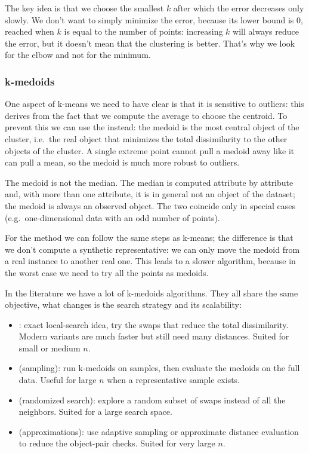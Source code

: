 The key idea is that we choose the smallest $k$ after which the error decreases only slowly. We don't want to simply minimize the error, because its lower bound is $0$, reached when $k$ is equal to the number of points: increasing $k$ will always reduce the error, but it doesn't mean that the clustering is better. That's why we look for the elbow and not for the minimum.

\subsubsection{k-medoids}

One aspect of k-means we need to have clear is that it is sensitive to outliers: this derives from the fact that we compute the average to choose the centroid. To prevent this we can use the  instead: the medoid is the most central object of the cluster, i.e.\ the real object that minimizes the total dissimilarity to the other objects of the cluster. A single extreme point cannot pull a medoid away like it can pull a mean, so the medoid is much more robust to outliers.

\begin{remark}
The medoid is not the median. The median is computed attribute by attribute and, with more than one attribute, it is in general not an object of the dataset; the medoid is always an observed object. The two coincide only in special cases (e.g.\ one-dimensional data with an odd number of points).
\end{remark}

For the  method we can follow the same steps as k-means; the difference is that we don't compute a synthetic representative: we can only move the medoid from a real instance to another real one. This leads to a slower algorithm, because in the worst case we need to try all the points as medoids.

In the literature we have a lot of k-medoids algorithms. They all share the same objective, what changes is the search strategy and its scalability:
\begin{itemize}
  \item {}: exact local-search idea, try the swaps that reduce the total dissimilarity. Modern variants are much faster but still need many distances. Suited for small or medium $n$.
  \item {} (sampling): run k-medoids on samples, then evaluate the medoids on the full data. Useful for large $n$ when a representative sample exists.
  \item {} (randomized search): explore a random subset of swaps instead of all the neighbors. Suited for a large search space.
  \item {} (approximations): use adaptive sampling or approximate distance evaluation to reduce the object-pair checks. Suited for very large $n$.
\end{itemize}

